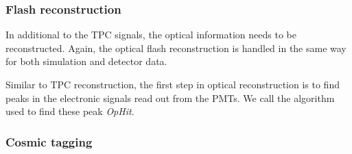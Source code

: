   \subsubsection{Flash reconstruction}

    In additional to the TPC signals, the optical information needs to be
    reconstructed. Again, the optical flash reconstruction is handled in the
    same way for both simulation and detector data.

    Similar to TPC reconstruction, the first step in optical reconstruction is
    to find peaks in the electronic signals read out from the PMTs. We call the
    algorithm used to find these peak \textit{OpHit}. 

  \subsubsection{Cosmic tagging}


